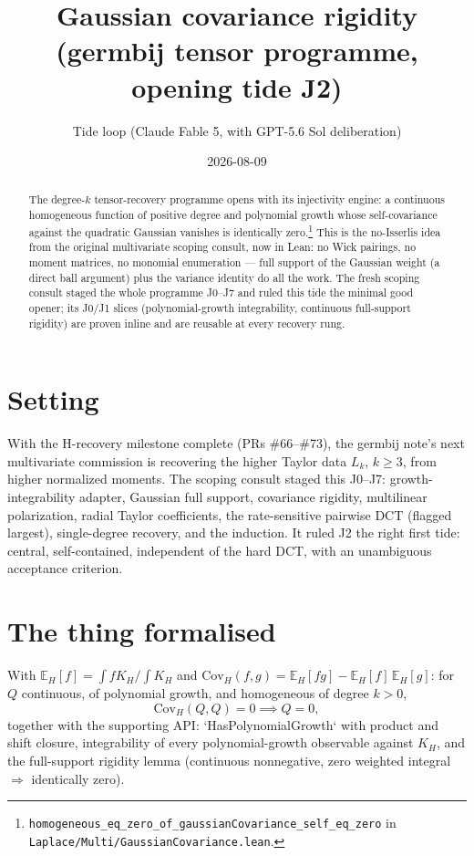 \documentclass[11pt]{article}
\title{Gaussian covariance rigidity\\
(germbij tensor programme, opening tide J2)}
\author{Tide loop (Claude Fable 5, with GPT-5.6 Sol deliberation)}
\date{2026-08-09}
\begin{document}
\maketitle

\begin{abstract}
\noindent The degree-$k$ tensor-recovery programme opens with its
injectivity engine: a continuous homogeneous function of positive
degree and polynomial growth whose self-covariance against the
quadratic Gaussian vanishes is identically
zero.\footnote{\texttt{homogeneous\_eq\_zero\_of\_gaussianCovariance\_self\_eq\_zero}
in \texttt{Laplace/Multi/GaussianCovariance.lean}.}
This is the no-Isserlis idea from the original multivariate scoping
consult, now in Lean: no Wick pairings, no moment matrices, no
monomial enumeration --- full support of the Gaussian weight (a
direct ball argument) plus the variance identity do all the work.
The fresh scoping consult staged the whole programme J0--J7 and
ruled this tide the minimal good opener; its J0/J1 slices
(polynomial-growth integrability, continuous full-support rigidity)
are proven inline and are reusable at every recovery rung.
\end{abstract}

\section{Setting}

With the H-recovery milestone complete (PRs \#66--\#73), the germbij
note's next multivariate commission is recovering the higher Taylor
data $L_k$, $k \ge 3$, from higher normalized moments. The scoping
consult staged this J0--J7: growth-integrability adapter, Gaussian
full support, covariance rigidity, multilinear polarization, radial
Taylor coefficients, the rate-sensitive pairwise DCT (flagged
largest), single-degree recovery, and the induction. It ruled J2 the
right first tide: central, self-contained, independent of the hard
DCT, with an unambiguous acceptance criterion.

\section{The thing formalised}

With $\mathbb{E}_H[f] = \int f K_H / \int K_H$ and
$\mathrm{Cov}_H(f,g) = \mathbb{E}_H[fg] - \mathbb{E}_H[f]\,
\mathbb{E}_H[g]$: for $Q$ continuous, of polynomial growth, and
homogeneous of degree $k > 0$,
\[
\mathrm{Cov}_H(Q, Q) = 0 \implies Q = 0,
\]
together with the supporting API: `HasPolynomialGrowth` with product
and shift closure, integrability of every polynomial-growth
observable against $K_H$, and the full-support rigidity lemma
(continuous nonnegative, zero weighted integral $\Rightarrow$
identically zero).
\end{document}
